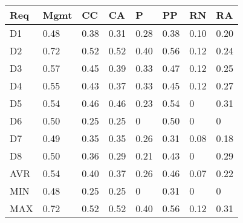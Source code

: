 \begin{tabularx}{\columnwidth}{|l|X|X|X|X|X|X|X|}
\hline
Req	& Mgmt & CC   & CA   & P    & PP   & RN	  & RA   \\\hline
D1	& 0.48 & 0.38 & 0.31 & 0.28 & 0.38 & 0.10 & 0.20 \\\hline
D2	& 0.72 & 0.52 & 0.52 & 0.40 & 0.56 & 0.12 & 0.24 \\\hline
D3	& 0.57 & 0.45 & 0.39 & 0.33 & 0.47 & 0.12 & 0.25 \\\hline
D4	& 0.55 & 0.43 & 0.37 & 0.33 & 0.45 & 0.12 & 0.27 \\\hline
D5	& 0.54 & 0.46 & 0.46 & 0.23 & 0.54 & 0    & 0.31 \\\hline
D6	& 0.50 & 0.25 & 0.25 & 0    & 0.50 & 0    & 0    \\\hline
D7	& 0.49 & 0.35 & 0.35 & 0.26 & 0.31 & 0.08 & 0.18 \\\hline
D8	& 0.50 & 0.36 & 0.29 & 0.21 & 0.43 & 0    & 0.29 \\\hline
AVR	& 0.54 & 0.40 & 0.37 & 0.26 & 0.46 & 0.07 & 0.22 \\\hline
MIN	& 0.48 & 0.25 & 0.25 & 0    & 0.31 & 0    & 0    \\\hline
MAX	& 0.72 & 0.52 & 0.52 & 0.40 & 0.56 & 0.12 & 0.31 \\\hline
\end{tabularx}